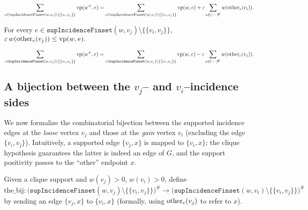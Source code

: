 \begin{lemma}\label{lem:enhance-gain-sum}
\[
  \sum_{e\in \operatorname{supIncidenceFinset}(w,v_i)\setminus\{\{v_i,v_j\}\}} \operatorname{vp}(w^+,e)
  = \sum_{e\in \operatorname{supIncidenceFinset}(w,v_i)\setminus\{\{v_i,v_j\}\}} \operatorname{vp}(w,e)
  + \varepsilon \sum_{e\in(\cdots)^{\!\#}} w(\operatorname{other}_e(v_i)).
\]
\leanok
\end{lemma}

\begin{lemma}\label{lem:epsilon-weight-bound}
For every $e\in \!\texttt{supIncidenceFinset}(w,v_j)\setminus\{\{v_i,v_j\}\}$,
\( \varepsilon\, w(\operatorname{other}_e(v_j)) \le \operatorname{vp}(w,e). \)
\leanok
\end{lemma}

\begin{lemma}\label{lem:enhance-loose-sum}
\[
  \sum_{e\in \!\texttt{supIncidenceFinset}(w,v_j)\setminus\{\{v_i,v_j\}\}} \operatorname{vp}(w^+,e)
  = \sum_{e\in \!\texttt{supIncidenceFinset}(w,v_j)\setminus\{\{v_i,v_j\}\}} \operatorname{vp}(w,e)
  - \varepsilon \sum_{e\in(\cdots)^{\!\#}} w(\operatorname{other}_e(v_j)).
\]
\leanok
\end{lemma}

\subsection{A bijection between the $v_j$– and $v_i$–incidence sides}

We now formalize the combinatorial bijection between the supported incidence
edges at the \emph{loose} vertex $v_j$ and those at the \emph{gain} vertex $v_i$
(excluding the edge $\{v_i,v_j\}$). Intuitively, a supported edge
$\{v_j,x\}$ is mapped to $\{v_i,x\}$; the clique hypothesis guarantees the
latter is indeed an edge of $G$, and the support positivity passes to the ``other''
endpoint $x$.

\begin{definition}\label{def:the-bij}
Given a clique support and $w(v_j)>0$, $w(v_i)>0$, define
\[
  \mathrm{the\_bij}:
  \bigl(\!\texttt{supIncidenceFinset}(w,v_j)\setminus\{\{v_i,v_j\}\}\bigr)^{\!\#}
  \longrightarrow
  \bigl(\!\texttt{supIncidenceFinset}(w,v_i)\setminus\{\{v_i,v_j\}\}\bigr)^{\!\#}
\]
by sending an edge $\{v_j,x\}$ to $\{v_i,x\}$ (formally, using
$\operatorname{other}_e(v_j)$ to refer to $x$).
\end{definition}


